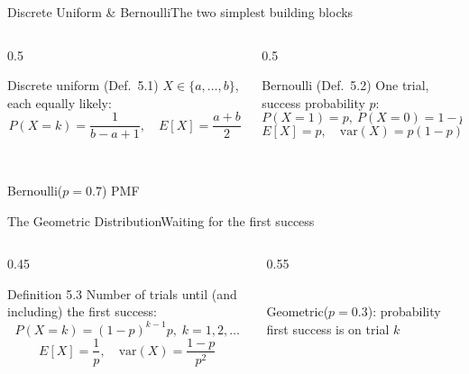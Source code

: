 \documentclass[aspectratio=169,11pt]{beamer}
\begin{document}
\begin{frame}{Discrete Uniform \& Bernoulli}{The two simplest building blocks}
  \begin{columns}[T]
    \begin{column}{0.5\textwidth}
      \begin{block}{Discrete uniform (Def.\ 5.1)}
        \small $X\in\{a,\dots,b\}$, each equally likely:
        \[ P(X=k) = \frac{1}{b-a+1}, \quad E[X]=\frac{a+b}{2} \]
      \end{block}
    \end{column}
    \begin{column}{0.5\textwidth}
      \begin{exampleblock}{Bernoulli (Def.\ 5.2)}
        \small One trial, success probability $p$:
        \[ P(X=1)=p,\ P(X=0)=1-p \]
        \[ E[X]=p, \quad \text{var}(X)=p(1-p) \]
      \end{exampleblock}
    \end{column}
  \end{columns}
  \vfill
  \begin{center}
  \\
  \scriptsize Bernoulli($p{=}0.7$) PMF
  \end{center}
\end{frame}

\begin{frame}{The Geometric Distribution}{Waiting for the first success}
  \begin{columns}[T]
    \begin{column}{0.45\textwidth}
      \begin{block}{Definition 5.3}
        \small Number of trials until (and including) the first success:
        \[ P(X=k) = (1-p)^{k-1}p, \; k=1,2,\dots \]
        \[ E[X] = \frac{1}{p}, \quad \text{var}(X)=\frac{1-p}{p^2} \]
      \end{block}
    \end{column}
    \begin{column}{0.55\textwidth}
      \centering
      \\
      \scriptsize Geometric($p{=}0.3$): probability first success is on trial $k$
    \end{column}
  \end{columns}
\end{frame}
\end{document}

